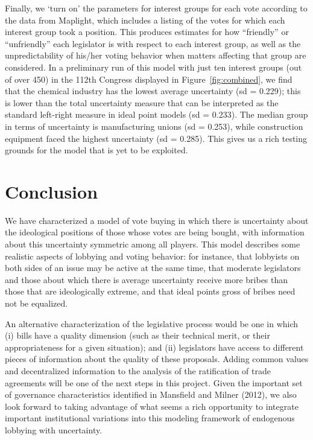 \documentclass[12pt]{article}
\begin{document}
Finally, we `turn on' the parameters for interest groups for each vote according to the data from Maplight, which includes a listing of the votes for which each interest group took a position. This produces estimates for how ``friendly'' or ``unfriendly'' each legislator is with respect to each interest group, as well as the unpredictability of his/her voting behavior when matters affecting that group are considered. In a preliminary run of this model with just ten interest groups (out of over 450) in the 112th Congress displayed in Figure~\ref{fig:combined}, we find that the chemical industry has the lowest average uncertainty (sd = 0.229); this is lower than the total uncertainty measure that can be interpreted as the standard left-right measure in ideal point models (sd = 0.233). The median group in terms of uncertainty is manufacturing unions (sd = 0.253), while construction equipment faced the highest uncertainty (sd = 0.285). This gives us a rich testing grounds for the model that is yet to be exploited.








\section{Conclusion}
\label{sec:concl}

We have characterized a model of vote buying in which there is uncertainty about the ideological positions of those whose votes are being bought, with information about this uncertainty symmetric among all players. This model describes some realistic aspects of lobbying and voting behavior: for instance, that lobbyists on both sides of an issue may be active at the same time, that moderate legislators and those about which there is average uncertainty receive more bribes than those that are ideologically extreme, and that ideal points gross of bribes need not be equalized.

An alternative characterization of the legislative process would be one in which (i) bills have a quality dimension (such as their technical merit, or their appropriateness for a given situation); and (ii) legislators have access to different pieces of information about the quality of these proposals. Adding common values and decentralized information to the analysis of the ratification of trade agreements will be one of the next steps in this project. Given the important set of governance characteristics identified in Mansfield and Milner (2012), we also look forward to taking advantage of what seems a rich opportunity to integrate important institutional variations into this modeling framework of endogenous lobbying with uncertainty.
\end{document}
